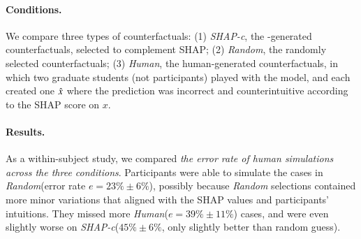 

\newcommand{\cshap}{\emph{SHAP-c}\xspace}
\newcommand{\crandom}{\emph{Random}\xspace}
\newcommand{\chuman}{\emph{Human}\xspace}
\paragraph{Conditions.} 
We compare three types of counterfactuals:
(1) \cshap, the \sysname-generated counterfactuals, selected to complement SHAP; 
(2) \crandom, the randomly selected \sysname counterfactuals; 
(3) \chuman, the human-generated counterfactuals, in which two graduate students (not participants) played with the model, and each created one $\hat{x}$ where the prediction was incorrect and counterintuitive according to the SHAP score on $x$.

\paragraph{Results.}
As a within-subject study, we compared \emph{the error rate of human simulations across the three conditions}.
Participants were able to simulate the cases in \crandom (error rate $e=23\%\pm6\%$), possibly because \crandom selections contained more minor variations that aligned with the SHAP values and participants' intuitions.
They missed more \chuman ($e=39\%\pm11\%$) cases, and were even slightly worse on \cshap ($45\%\pm 6\%$, only slightly better than random guess).%

